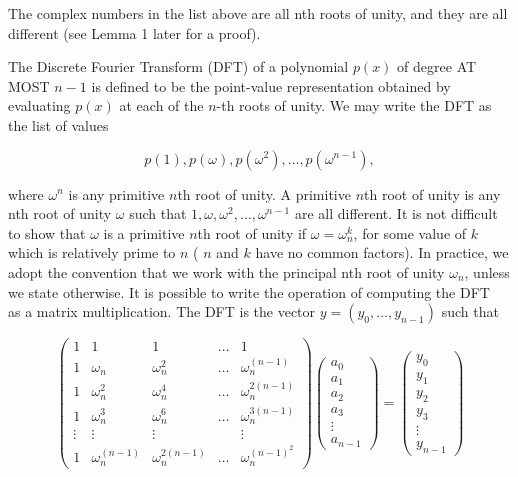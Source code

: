 The complex numbers in the list above are all nth roots of unity, and they are all different (see Lemma 1 later for a proof).

The Discrete Fourier Transform (DFT) of a polynomial $p(x)$ of degree AT MOST $n-1$ is defined to be the point-value representation obtained by evaluating $p(x)$ at each of the $n$-th roots of unity. We may write the DFT as the list of values

$$
p(1), p(\omega), p\left(\omega^{2}\right), \ldots, p\left(\omega^{n-1}\right),
$$

where $\omega^{n}$ is any primitive $n$th root of unity. A primitive $n$th root of unity is any nth root of unity $\omega$ such that $1, \omega, \omega^{2}, \ldots, \omega^{n-1}$ are all different. It is not difficult to show that $\omega$ is a primitive $n$th root of unity if $\omega=\omega_{n}^{k}$, for some value of $k$ which is relatively prime to $n$ ( $n$ and $k$ have no common factors). In practice, we adopt the convention that we work with the principal nth root of unity $\omega_{n}$, unless we state otherwise. It is possible to write the operation of computing the DFT\\
as a matrix multiplication. The DFT is the vector $y=\left(y_{0}, \ldots, y_{n-1}\right)$ such that

$$
\left(\begin{array}{ccccc}
1 & 1 & 1 & \ldots & 1 \\
1 & \omega_{n} & \omega_{n}^{2} & \ldots & \omega_{n}^{(n-1)} \\
1 & \omega_{n}^{2} & \omega_{n}^{4} & \ldots & \omega_{n}^{2(n-1)} \\
1 & \omega_{n}^{3} & \omega_{n}^{6} & \ldots & \omega_{n}^{3(n-1)} \\
\vdots & \vdots & \vdots & & \vdots \\
1 & \omega_{n}^{(n-1)} & \omega_{n}^{2(n-1)} & \ldots & \omega_{n}^{(n-1)^{2}}
\end{array}\right)\left(\begin{array}{c}
a_{0} \\
a_{1} \\
a_{2} \\
a_{3} \\
\vdots \\
a_{n-1}
\end{array}\right)=\left(\begin{array}{c}
y_{0} \\
y_{1} \\
y_{2} \\
y_{3} \\
\vdots \\
y_{n-1}
\end{array}\right)
$$

